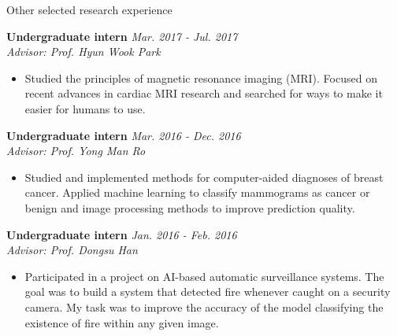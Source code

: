 \documentclass{resume} %
\begin{document}
\begin{rSection}{Other selected research experience}

\textbf{Undergraduate intern}
\hfill \textit{Mar. 2017 - Jul. 2017}\\
\textit{Advisor: Prof. Hyun Wook Park}
\begin{itemize}
	\item Studied the principles of magnetic resonance imaging (MRI). Focused on recent advances in cardiac MRI research and searched for ways to make it easier for humans to use.
\end{itemize}
 	
\textbf{Undergraduate intern}
\hfill \textit{Mar. 2016 - Dec. 2016}\\
\textit{Advisor: Prof. Yong Man Ro}
\begin{itemize}
	\item Studied and implemented methods for computer-aided diagnoses of breast cancer. Applied machine learning to classify mammograms as cancer or benign and image processing methods to improve prediction quality.
\end{itemize}

\textbf{Undergraduate intern}
\hfill \textit{Jan. 2016 - Feb. 2016}\\
\textit{Advisor: Prof. Dongsu Han}
\begin{itemize}
	\item Participated in a project on AI-based automatic surveillance systems. The goal was to build a system that detected fire whenever caught on a security camera. My task was to improve the accuracy of the model classifying the existence of fire within any given image.
\end{itemize}

\end{rSection}

\end{document}
